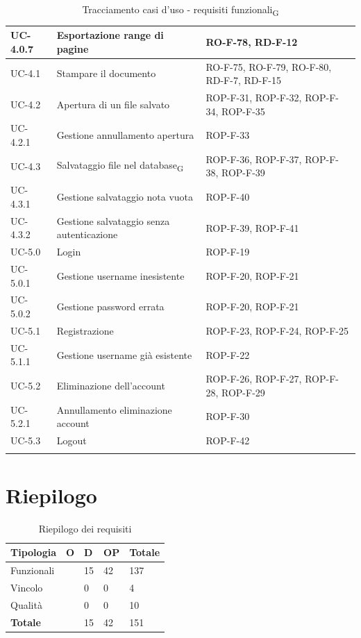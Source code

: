 \documentclass[11pt,a4paper]{article}
\newcommand{\gls}[1]{#1\textsubscript{G}}
\begin{document}
\begin{longtable}{|p{}|p{}|>{\raggedright\arraybackslash}p{}|}
\hline
UC-4.0.7 & Esportazione range di pagine & RO-F-78, RD-F-12 \\
\hline
UC-4.1 & Stampare il documento & RO-F-75, RO-F-79, RO-F-80, RD-F-7, RD-F-15 \\
\hline
UC-4.2 & Apertura di un file salvato & ROP-F-31, ROP-F-32, ROP-F-34, ROP-F-35 \\
\hline
UC-4.2.1 & Gestione annullamento apertura & ROP-F-33 \\
\hline
UC-4.3 & Salvataggio file nel \gls{database} & ROP-F-36, ROP-F-37, ROP-F-38, ROP-F-39 \\
\hline
UC-4.3.1 & Gestione salvataggio nota vuota & ROP-F-40 \\
\hline
UC-4.3.2 & Gestione salvataggio senza autenticazione & ROP-F-39, ROP-F-41 \\
\hline
UC-5.0 & Login & ROP-F-19 \\
\hline
UC-5.0.1 & Gestione username inesistente & ROP-F-20, ROP-F-21 \\
\hline
UC-5.0.2 & Gestione password errata & ROP-F-20, ROP-F-21 \\
\hline
UC-5.1 & Registrazione & ROP-F-23, ROP-F-24, ROP-F-25 \\
\hline
UC-5.1.1 & Gestione username già esistente & ROP-F-22 \\
\hline
UC-5.2 & Eliminazione dell'account & ROP-F-26, ROP-F-27, ROP-F-28, ROP-F-29 \\
\hline
UC-5.2.1 & Annullamento eliminazione account & ROP-F-30 \\
\hline
UC-5.3 & Logout & ROP-F-42 \\
\hline
\addlinespace[1em]
\caption{Tracciamento casi d'uso - \gls{requisiti funzionali}}
\end{longtable}

\newpage

\section{Riepilogo}
\begin{table}[H]
\centering
\begin{tabular}{|p{}|>{\raggedright\arraybackslash}p{}|p{}|p{}|p{}|}
\hline
\textbf{Tipologia} & \textbf{O} & \textbf{D} & \textbf{OP} & \textbf{Totale}\\
\hline
Funzionali & 80 & 15 & 42 & 137 \\
\hline
Vincolo & 4 & 0 & 0 & 4 \\
\hline
Qualità & 10 & 0 & 0 & 10 \\
\hline
\textbf{Totale} & 94 & 15 & 42 & 151 \\
\hline
\end{tabular}
\caption{Riepilogo dei requisiti}
\end{table}
\end{document}
